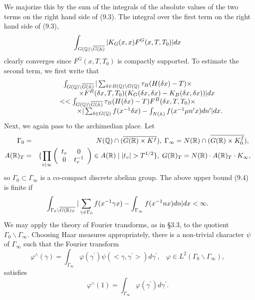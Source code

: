 We majorize this by the sum of the integrals of the absolute values of the
two terms on the right hand side of (9.3). The integral over the first term
on the right hand side of (9.3), 
\[
\int_{G({\Bbb{Q}})\backslash \overline{G({\Bbb{A}})}}|K_G(x,x)F^G(x,T,T_0)|dx 
\]
clearly converges since $F^G(x,T,T_0)$ is compactly supported. To estimate
the second term, we first write that 
\begin{equation}
\begin{array}{c}
\int_{G({\Bbb{Q}})\backslash \overline{G({\Bbb{A}})}}|
\sum_{\delta \in B({\Bbb{Q}})\backslash G({\Bbb{Q}})}
\tau _B(H(\delta x)-T)\times \\
\;\;\;\;\;\;\;\;\;\;\;\;\;\;\;\;\;\;\;\;\times F^B(\delta
x,T,T_0)(K_G(\delta x,\delta x)-K_B(\delta x,\delta x))|dx \\
<<\int_{G({\Bbb{Q}})\backslash \overline{G({\Bbb{A}})}}
\tau _B(H(\delta x)-T)F^B(\delta x,T,T_0)\times  \nonumber \\
\;\;\;\;\;\;\;\;\;\;\;\;\;\;\;\;\;\;\;\;\;\;\;\times
|\sum_{\delta \in G({\Bbb{Q}})}f(x^{-1}\delta x)
-\int_{N({\Bbb{A}})}f(x^{-1}\mu n^{\prime }x)dn^{\prime }|dx.
\end{array}
\end{equation}
Next, we again pass to the archimedian place. Let 
\begin{eqnarray}
\Gamma _0 &=&N({\Bbb{Q}})\cap (\overline{G({\Bbb{R}})\times K^f}),
\;\Gamma_\infty
=N({\Bbb{R}})\cap (\overline{G({\Bbb{R}})\times K_0^f}),\; \\
A({\Bbb{R}})_T &=&\{\prod_{v|\infty}
\left( 
\begin{array}{cc}
t_v & 0 \\ 
0 & t_v^{-1}
\end{array}
\right) \in A({\Bbb{R}})\;|\;|t_v|>T^{1/2}\},
\;G({\Bbb{R}})_T=N({\Bbb{R}})\cdot A({\Bbb{R}})_T\cdot K_\infty ,  
\nonumber
\end{eqnarray}
so $\Gamma _0\subset \Gamma _\infty $ is a co-compact discrete abelian
group. The above upper bound (9.4) is finite if 
\begin{equation}
\int_{\Gamma _0\backslash \overline{G({\Bbb{R}})_T}}|\sum_{\gamma \in \Gamma
_0}f(x^{-1}\gamma x)-\int_{\Gamma _\infty }f(x^{-1}nx)dn|dx<\infty .
\end{equation}
We may apply the theory of Fourier transforms, as in \S 3.3, to the 
quotient $\Gamma _0\backslash \Gamma _\infty $. 
Choosing Haar measures appropriately,
there is a non-trivial character 
$\psi $ of $\Gamma _\infty $ such that the Fourier transform 
\[
\varphi ^{\wedge }(\gamma )
=\int_{\Gamma _\infty }\varphi (\gamma ^{\prime})
\psi (<\gamma ,\gamma ^{\prime }>)d\gamma ^{\prime },
\;\;\;\varphi \in L^2(\Gamma _0\backslash \Gamma _\infty ), 
\]
satisfies 
\[
\varphi ^{\wedge }(1)=\int_{\Gamma _\infty }\varphi (\gamma ^{\prime
})d\gamma ^{\prime }. 
\]

